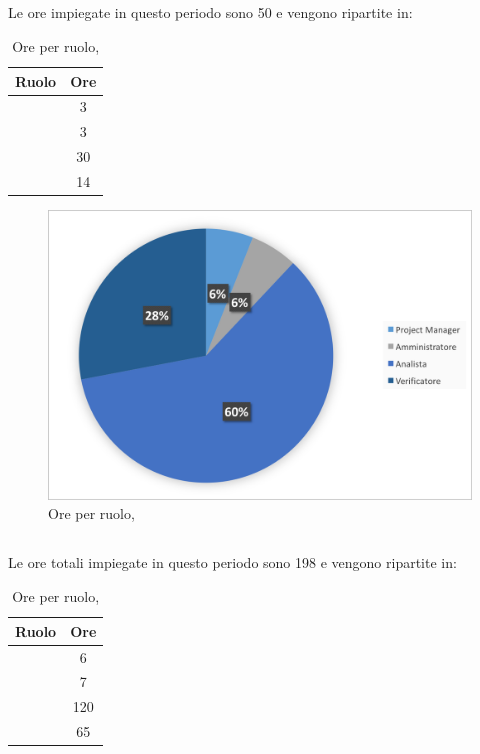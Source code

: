 \newpage
\subsection{\ARD}
Le ore impiegate in questo periodo sono 50 e vengono ripartite in:

\begin{table}[h]
	\begin{center}
		\begin{tabular}{|c|c|}
			\hline
			\textbf{Ruolo}	& \textbf{Ore} \\
			\hline
			\Pm &	3\\
			\hline
			\Am	&	3\\
			\hline
			\An		&	30\\
			\hline
			\Ver	&	14\\
			\hline
		\end{tabular}
	\end{center}
	\caption{Ore per ruolo, \ARD}
\end{table}

\begin{figure}[H]
	\centering 
	\includegraphics[scale=0.7]{Immagini/GraficiTorte/ARD.png}
	\caption{Ore per ruolo, \ARD}
\end{figure}
\newpage
\subsection{\PA}
Le ore totali impiegate in questo periodo sono 198 e vengono ripartite in:

\begin{table}[h]
	\begin{center}
		\begin{tabular}{|c|c|}
			\hline
			\textbf{Ruolo}	& \textbf{Ore} \\
			\hline
			\Pm &	6\\
			\hline
			\Am	& 7\\
			\hline
			\Prog & 120\\
			\hline
			\Ver	&	65\\
			\hline
		\end{tabular}
	\end{center}
	\caption{Ore per ruolo, \PA}
\end{table}

